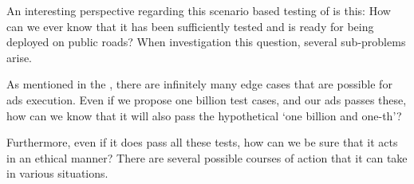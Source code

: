 An interesting perspective regarding this scenario based testing of
 is this: How can we ever know that it has been sufficiently
tested and is ready for being deployed on public roads? When investigation this
question, several sub-problems arise.

As mentioned in the , there are infinitely many
edge cases that are possible for \acrshort{ads} execution. Even if we propose
one billion test cases, and our \acrshort{ads} passes these, how can we know
that it will also pass the hypothetical `one billion and one-th'?

Furthermore, even if it does pass all these tests, how can we be sure that it
acts in an ethical manner? There are several possible courses of action that it
can take in various situations.